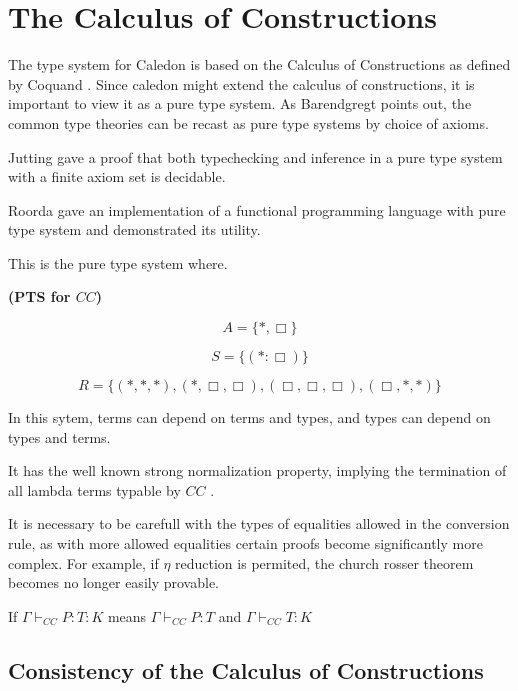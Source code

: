\section{The Calculus of Constructions}

The type system for Caledon is based on the Calculus of Constructions as defined by Coquand \citep{coquand1986calculus}.
Since caledon might extend the calculus of constructions, it is important to view it as a pure type system. 
As Barendgregt points out, the common type theories can be recast as pure type systems
by choice of axioms. 

Jutting \citep{jutting1993typing} gave a proof that both typechecking and inference
in a pure type system with a finite axiom set is decidable.

Roorda \citep{roorda2001pure} gave an implementation of a functional programming language with 
pure type system and demonstrated its utility.

This is the pure type system where.

\begin{definition}
\textbf{(PTS for $CC$)}

\[
A = \{ *, \Box \}
\]

\[
S = \{ (* : \Box) \}
\]

\[ 
R = \{ (*,*,*),(*,\Box,\Box),(\Box,\Box,\Box),(\Box,*,*)\}
\]  
\label{coc:types}
\end{definition}

In this sytem, terms can depend on terms and types, 
and types can depend on types and terms.  

It has the well known strong normalization property, implying the termination of 
all lambda terms typable by $CC$ \citep{Geuvers94ashort} \citep{geuvers1991modular}.

It is necessary to be carefull with the types of equalities allowed in the conversion rule, 
as with more allowed equalities certain proofs
become significantly more complex.  For example, if $\eta$ reduction is permited, 
the church rosser theorem becomes no longer easily provable.

\begin{definition}
If $\Gamma \vdash_{CC} P : T : K$ means $\Gamma \vdash_{CC} P : T$ and $\Gamma \vdash_{CC} T : K$
\end{definition}


\subsection{Consistency of the Calculus of Constructions}

